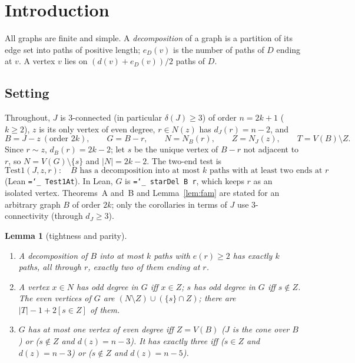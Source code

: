 \documentclass[11pt]{amsart}
\newtheorem{lemma}[theorem]{Lemma}
\theoremstyle{definition}
\newcommand{\lean}[1]{\texttt{\hyphenchar\font=`\_ #1}}
\begin{document}
\maketitle

\section{Introduction}

All graphs are finite and simple. A \emph{decomposition} of a graph is a partition of its edge set
into paths of positive length; $e_D(v)$ is the number of paths of $D$ ending at $v$. A vertex $v$
lies on $(d(v)+e_D(v))/2$ paths of $D$.

\subsection*{Setting} Throughout, $J$ is $3$-connected (in particular $\delta(J)\ge3$) of order
$n=2k+1$ ($k\ge2$), $z$ is its only vertex of even degree, $r\in N(z)$ has $d_J(r)=n-2$, and
\[
B=J-z\ (\text{order }2k),\qquad G=B-r,\qquad N=N_B(r),\qquad Z=N_J(z),\qquad T=V(B)\setminus Z .
\]
Since $r\sim z$, $d_B(r)=2k-2$; let $s$ be the unique vertex of $B-r$ not adjacent to $r$, so
$N=V(G)\setminus\{s\}$ and $|N|=2k-2$. The two-end test is
\[
\mathrm{Test1}(J,z,r):\quad B\text{ has a decomposition into at most $k$ paths with at least two ends at $r$}
\]
(Lean \lean{Test1At}). In Lean, $G$ is \lean{starDel B r}, which keeps $r$ as an isolated vertex.
Theorems~A and~B and Lemma~\ref{lem:fam} are stated for an arbitrary graph $B$ of order $2k$; only
the corollaries in terms of $J$ use $3$-connectivity (through $d_J\ge3$).

\begin{lemma}[tightness and parity]\label{lem:basic}
\begin{enumerate}[label=(\alph*)]
\item A decomposition of $B$ into at most $k$ paths with $e(r)\ge2$ has exactly $k$ paths, all through
$r$, exactly two of them ending at $r$.
\item A vertex $x\in N$ has odd degree in $G$ iff $x\in Z$; $s$ has odd degree in $G$ iff $s\notin Z$.
The even vertices of $G$ are $(N\setminus Z)\cup(\{s\}\cap Z)$; there are $|T|-1+2[s\in Z]$ of them.
\item $G$ has at most one vertex of even degree iff $Z=V(B)$ ($J$ is the cone over $B$) or
($s\notin Z$ and $d(z)=n-3$). It has exactly three iff ($s\in Z$ and $d(z)=n-3$) or ($s\notin Z$
and $d(z)=n-5$).
\end{enumerate}
\end{lemma}
\end{document}
